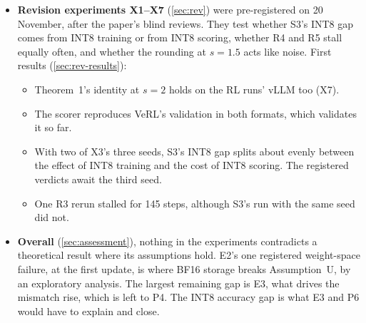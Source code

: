 \documentclass[11pt]{article}
\begin{document}
\begin{itemize}
\begin{itemize}
  \item After 435 steps the rounding error still correlates 0.69 with its start, as Proposition~6 predicts.
  \item From the second update on, the rollout captures 97--99\% of each update. The one failure is the first update from the BF16 checkpoint, captured at 93\%; an exploratory simulation reproduces it from BF16 storage alone.
  \item In policy space the INT8 rollout follows the trainer with slope 0.93 over the run, where a frozen rollout gives 0. The registered $\pm10\%$ band fails in 2 of 11 checks.
  \item On stored checkpoints, Assumption~U holds at the rounding boundary in all 21 cells (7 projection types of the 0.5B, 1.5B and 7B models). Its bulk test fails narrowly in one cell (0.052 against 0.05), again from BF16 storage. Lemma~1's condition $\sigma/\Delta\ge1$ holds in every row.
  \end{itemize}
\item \textbf{Revision experiments X1--X7} (\cref{sec:rev}) were pre-registered on 20 November, after the paper's blind reviews. They test whether S3's INT8 gap comes from INT8 training or from INT8 scoring, whether R4 and R5 stall equally often, and whether the rounding at $s=1.5$ acts like noise. First results (\cref{sec:rev-results}):
  \begin{itemize}
  \item Theorem~1's identity at $s=2$ holds on the RL runs' vLLM too (X7).
  \item The scorer reproduces VeRL's validation in both formats, which validates it so far.
  \item With two of X3's three seeds, S3's INT8 gap splits about evenly between the effect of INT8 training and the cost of INT8 scoring. The registered verdicts await the third seed.
  \item One R3 rerun stalled for 145 steps, although S3's run with the same seed did not.
  \end{itemize}
\item \textbf{Overall} (\cref{sec:assessment}), nothing in the experiments contradicts a theoretical result where its assumptions hold. E2's one registered weight-space failure, at the first update, is where BF16 storage breaks Assumption~U, by an exploratory analysis. The largest remaining gap is E3, what drives the mismatch rise, which is left to P4. The INT8 accuracy gap is what E3 and P6 would have to explain and close.
\end{itemize}
\end{document}
